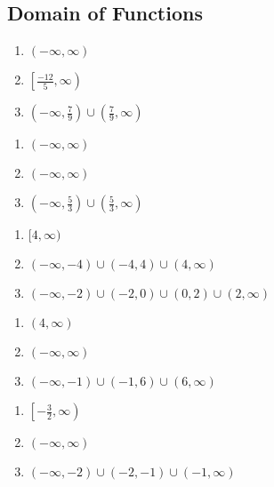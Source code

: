 \subsection*{Domain of Functions}

\begin{multicols}{3}
\begin{enumerate}
	\item $(-\infty, \infty)$
	\item $\left[\frac{-12}{5}, \infty\right)$
	\item $\left(-\infty, \frac{7}{9}\right) \cup \left(\frac{7}{9}, \infty\right)$
\end{enumerate}	\setcounter{Review}{\value{enumi}}
\end{multicols}
\begin{multicols}{3}
\begin{enumerate}	\setcounter{enumi}{\value{Review}}
	\item $(-\infty, \infty)$
	\item $(-\infty, \infty)$
	\item $\left(-\infty, \frac{5}{3}\right) \cup \left(\frac{5}{3}, \infty\right)$
\end{enumerate}	\setcounter{Review}{\value{enumi}}
\end{multicols}
\begin{multicols}{3}
\begin{enumerate}	\setcounter{enumi}{\value{Review}}
	\item $[4, \infty)$
	\item $(-\infty, -4) \cup (-4, 4) \cup (4, \infty)$
	\item $(-\infty, -2) \cup (-2, 0) \cup (0,2) \cup (2, \infty)$
\end{enumerate}	\setcounter{Review}{\value{enumi}}
\end{multicols}
\begin{multicols}{3}
\begin{enumerate}	\setcounter{enumi}{\value{Review}}
	\item $(4, \infty)$
	\item $(-\infty, \infty)$
	\item $(-\infty, -1) \cup (-1, 6) \cup (6, \infty)$
\end{enumerate}	\setcounter{Review}{\value{enumi}}
\end{multicols}
\begin{multicols}{3}
\begin{enumerate}	\setcounter{enumi}{\value{Review}}
	\item $\left[-\frac{3}{2}, \infty\right)$
	\item $(-\infty, \infty)$
	\item $(-\infty, -2) \cup (-2,-1) \cup (-1,\infty)$
\end{enumerate}	\setcounter{Review}{\value{enumi}}
\end{multicols}
